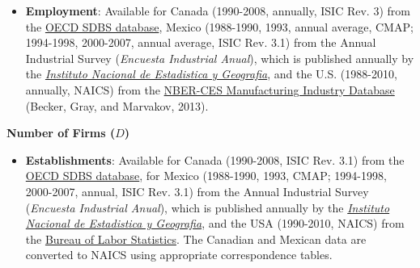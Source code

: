 \begin{spacing}{1}
\begin{itemize}
	\item \textbf{Employment}: Available for Canada (1990-2008, annually, ISIC Rev. 3) from the \href{http://stats.oecd.org/index.aspx?queryid=224}{OECD SDBS database},  Mexico (1988-1990, 1993, annual average, CMAP; 1994-1998, 2000-2007, annual average, ISIC Rev. 3.1) from the Annual Industrial Survey (\emph{Encuesta Industrial Anual}), which is published annually by   the \href{http://buscador.inegi.org.mx/search?q=encuesta+industrial+anual&client=ProductosR&proxystylesheet=ProductosR&num=10&getfields=*&sort=meta:edicion:D:E:::D&entsp=a__inegi_politica_p72&lr=lang_es\%7Clang_en&oe=UTF-8&ie=UTF-8&ip=10.210.100.253&entqr=3&filter=0&site=ProductosBuscador&tlen=260&ulang=en&start=0}{\emph{Instituto Nacional de Estadistica y Geografia}}, and the U.S. (1988-2010, annually, NAICS) from the \href{http://www.nber.org/nberces/}{NBER-CES Manufacturing Industry Database} (Becker, Gray, and Marvakov, 2013).  	
	\end{itemize}
	
\noindent \textbf{Number of Firms ($D$)}
	\begin{itemize}
	

	\item \textbf{Establishments}: Available for Canada (1990-2008, ISIC Rev. 3.1) from the \href{http://stats.oecd.org/index.aspx?queryid=224}{OECD SDBS database}, for Mexico (1988-1990, 1993, CMAP; 1994-1998, 2000-2007, annual, ISIC Rev. 3.1) from the Annual Industrial Survey (\emph{Encuesta Industrial Anual}), which is published annually by   the \href{http://buscador.inegi.org.mx/search?q=encuesta+industrial+anual&client=ProductosR&proxystylesheet=ProductosR&num=10&getfields=*&sort=meta:edicion:D:E:::D&entsp=a__inegi_politica_p72&lr=lang_es\%7Clang_en&oe=UTF-8&ie=UTF-8&ip=10.210.100.253&entqr=3&filter=0&site=ProductosBuscador&tlen=260&ulang=en&start=0}{\emph{Instituto Nacional de Estadistica y Geografia}}, and the USA (1990-2010, NAICS) from the \href{http://www.bls.gov/cew/doc/titles/ownership/ownership_titles.htm}{Bureau of Labor Statistics}. The Canadian and Mexican data are converted to NAICS using appropriate correspondence tables. 
		

\end{itemize}
\end{spacing}
